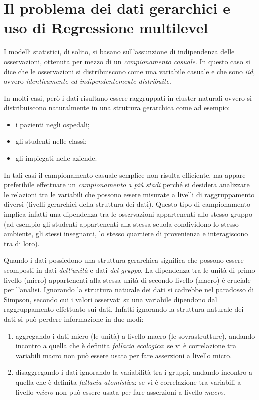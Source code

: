 \documentclass[a4page, 11pt]{article} %
\begin{document}
\section{Il problema dei dati gerarchici e uso di Regressione multilevel}
I modelli statistici, di solito, si basano sull'assunzione di indipendenza delle osservazioni, ottenuta per mezzo di un \textit{campionamento casuale}.
In questo caso si dice che le osservazioni si distribuiscono come una variabile casuale e che sono \textit{iid}, ovvero \textit{identicamente ed indipendentemente distribuite}.

In molti casi, però i dati risultano essere raggruppati in cluster naturali ovvero si distribuiscono naturalmente in una struttura gerarchica come ad esempio:
\begin{itemize}[noitemsep]
\item  i pazienti negli ospedali;
\item  gli studenti nelle classi;
\item gli impiegati nelle aziende.
\end{itemize}
In tali casi il campionamento casuale semplice non risulta efficiente, ma appare preferibile effettuare un \textit{campionamento a più stadi} perché si desidera analizzare le relazioni tra le variabili che possono essere misurate a livelli di raggruppamento diversi (livelli gerarchici della struttura dei dati).
Questo tipo di campionamento implica infatti una dipendenza tra le osservazioni appartenenti allo stesso gruppo (ad esempio gli studenti appartenenti alla stessa scuola condividono lo stesso ambiente, gli stessi insegnanti, lo stesso quartiere di provenienza e interagiscono tra di loro).

Quando i dati possiedono una struttura gerarchica significa che possono essere scomposti in dati \textit{dell'unità} e dati \textit{del gruppo}.
La dipendenza tra le unità di primo livello (micro) appartenenti alla stessa unità di secondo livello (macro) è cruciale per l’analisi.
\newline
Ignorando la struttura naturale dei dati si cadrebbe nel paradosso di Simpson, secondo cui i valori osservati su una variabile dipendono dal raggruppamento effettuato sui dati.
Infatti ignorando la struttura naturale dei dati si può perdere informazione in due modi:
\begin{enumerate}[noitemsep]
\item aggregando i dati micro (le unità) a livello macro (le sovrastrutture), andando incontro a quella che è definita \textit{fallacia ecologica}: se vi è correlazione tra variabili macro non può essere usata per fare asserzioni a livello micro.
\item disaggregando i dati ignorando la variabilità tra i gruppi, andando incontro a quella che è definita \textit{fallacia atomistica}: se vi è correlazione tra variabili a livello \textit{micro} non può essere usata per fare asserzioni a livello \textit{macro}.
\end{enumerate}
\end{document}
